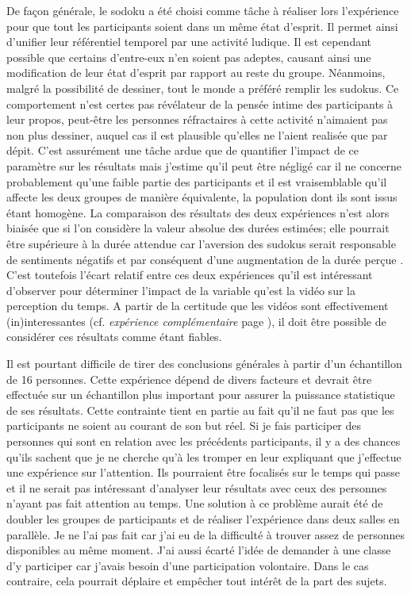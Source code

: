 \documentclass[12pt,fleqn,oneside,openany]{book} %
\begin{document}
De façon générale, le sodoku a été choisi comme tâche à réaliser lors l'expérience pour que tout les participants soient dans un même état d'esprit. Il permet ainsi d'unifier leur référentiel temporel par une activité ludique. Il est cependant possible que certains d'entre-eux n'en soient pas adeptes, causant ainsi une modification de leur état d'esprit par rapport au reste du groupe. Néanmoins, malgré la possibilité de dessiner, tout le monde a préféré remplir les sudokus. Ce comportement n'est certes pas révélateur de la pensée intime des participants à leur propos, peut-être les personnes réfractaires à cette activité n'aimaient pas non plus dessiner, auquel cas il est plausible qu'elles ne l'aient realisée que par dépit. C'est assurément une tâche ardue que de quantifier l'impact de ce paramètre sur les résultats mais j'estime qu'il peut être négligé car il ne concerne probablement qu'une faible partie des participants et il est vraisemblable qu'il affecte les deux groupes de manière équivalente, la population dont ils sont issus étant homogène. La comparaison des résultats des deux expériences n'est alors biaisée que si l'on considère la valeur absolue des durées estimées; elle pourrait être supérieure à la durée attendue car l'aversion des sudokus serait responsable de sentiments négatifs et par conséquent d'une augmentation de la durée perçue \cite{emotionsTemps,emotionsTemps2}. C'est toutefois l'écart relatif entre ces deux expériences qu'il est intéressant d'observer pour déterminer l'impact de la variable qu'est la vidéo sur la perception du temps. A partir de la certitude que les vidéos sont effectivement (in)interessantes (cf. \emph{expérience complémentaire} page \pageref{ssec:exp2.2}), il doit être possible de considérer ces résultats comme étant fiables. 

Il est pourtant difficile de tirer des conclusions générales à partir d'un échantillon de 16 personnes. Cette expérience dépend de divers facteurs et devrait être effectuée sur un échantillon plus important pour assurer la puissance statistique de ses résultats. Cette contrainte tient en partie au fait qu'il ne faut pas que les participants ne soient au courant de son but réel. Si je fais participer des personnes qui sont en relation avec les précédents participants, il y a des chances qu'ils sachent que je ne cherche qu'à les tromper en leur expliquant que j'effectue une expérience sur l'attention. Ils pourraient être focalisés sur le temps qui passe et il ne serait pas intéressant d'analyser leur résultats avec ceux des personnes n'ayant pas fait attention au temps. Une solution à ce problème aurait été de doubler les groupes de participants et de réaliser l'expérience dans deux salles en parallèle. Je ne l'ai pas fait car j'ai eu de la difficulté à trouver assez de personnes disponibles au même moment. J'ai aussi écarté l'idée de demander à une classe d'y participer car j'avais besoin d'une participation volontaire. Dans le cas contraire, cela pourrait déplaire et empêcher tout intérêt de la part des sujets.
\end{document}
